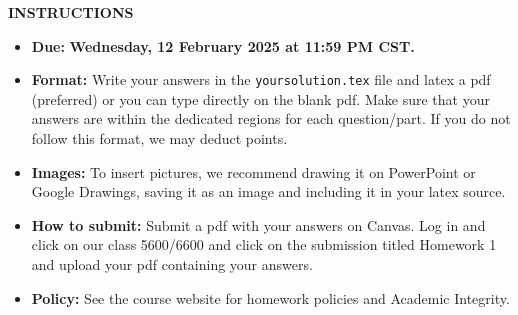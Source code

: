 \thispagestyle{empty}



\maketitle 
\smallskip
\smallskip
\textbf{INSTRUCTIONS}

\begin{itemize}
\item \textbf{Due:} \textbf{Wednesday, 12 February 2025 at 11:59 PM CST.} 
\item \textbf{Format:} Write your answers in the \texttt{yoursolution.tex} file and latex a pdf (preferred) or you can type directly on the blank pdf. Make sure that your answers are within the dedicated regions for each question/part. If you do not follow this format, we may deduct points. 
\item \textbf{Images:} To insert pictures, we recommend drawing it on PowerPoint or Google Drawings, saving it as an image and including it in your latex source.
\item \textbf{How to submit:} Submit a pdf with your answers on Canvas. Log in and click on our class 5600/6600 and click on the submission titled Homework 1 and upload your pdf containing your answers. 
\item \textbf{Policy:} See the course website for homework policies and Academic Integrity.

\end{itemize}

